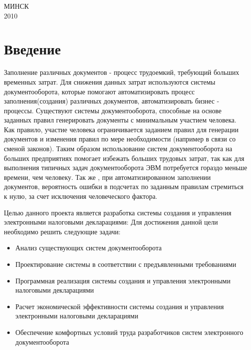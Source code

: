 \documentclass[14pt,a4paper]{reportmod}
\begin{document}
\begin{titlepage}
\vspace{1cm}

\begin{center}
МИНСК\\[10pt]
2010
\end{center}

\end{titlepage}

\linespread{1.05}
\setcounter{page}{4}
\thispagestyle{empty}
\tableofcontents

\chapter*{Введение}
Заполнение различных документов - процесс трудоемкий, требующий больших временных затрат. Для снижения данных затрат используются системы документооборота, которые помогают автоматизировать процесс заполнения(создания) различных документов, автоматизировать бизнес - процессы. Существуют системы документооборота, способные на основе заданных правил генерировать документы с минимальным участием человека. Как правило, участие человека ограничивается заданием правил для генерации документов и изменения правил по мере необходимости (например в связи со сменой законов). Таким образом использование систем документооборота на больших предприятиях помогает избежать больших трудовых затрат, так как для выполнения типичных задач документооборота ЭВМ потребуется гораздо меньше времени, чем человеку. Так же , при автоматизированном заполнении документов, вероятность ошибки в подсчетах по заданным правилам стремиться к нулю, за счет исключения человеческого фактора.


Целью данного проекта является разработка системы создания и управления электронными налоговыми декларациями: Для достижения данной цели необходимо решить следующие задачи:
\begin{itemize}
  \item Анализ существующих систем документооборота
  \item Проектирование системы в соответствии с предъявленными требованиями
  \item Программная реализация системы создания и управления электронными налоговыми декларациями
  \item Расчет экономической эффективности системы создания и управления электронными налоговыми декларациями
  \item Обеспечение комфортных условий труда разработчиков систем электронного документооборота
\end{itemize}
\end{document}
